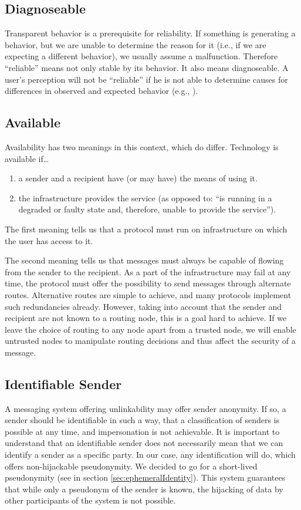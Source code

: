 \subsection{Diagnoseable}
Transparent behavior is a prerequisite for reliability. If something is generating a  behavior, but we are unable to determine the reason for it (i.e., if we are expecting a different behavior), we usually assume a malfunction. Therefore ``reliable'' means not only stable by its behavior. It also means diagnoseable. A user's perception will not be ``reliable'' if he is not able to determine causes for differences in observed and expected behavior (e.g., \cite{nicholson2003assessing}).

\subsection{Available}
Availability has two meanings in this context, which do differ. Technology is available if\ldots
\begin{enumerate}
	\item a sender and a recipient have (or may have) the means of using it.
	\item the infrastructure provides the service (as opposed to: ``is running in a degraded or faulty state and, therefore, unable to provide the service'').
\end{enumerate}

The first meaning tells us that a protocol must run on infrastructure on which the user has access to it.

The second meaning tells us that messages must always be capable of flowing from the sender to the recipient. As a part of the infrastructure may fail at any time, the protocol must offer the possibility to send messages through alternate routes. Alternative routes are simple to achieve, and many protocols implement such redundancies already. However, taking into account that the sender and recipient are not known to a routing node, this is a goal hard to achieve. If we leave the choice of routing to any node apart from a trusted node, we will enable untrusted nodes to manipulate routing decisions and thus affect the security of a message.

\subsection{Identifiable Sender}
A messaging system offering unlinkability may offer sender anonymity. If so, a sender should be identifiable in such a way, that a classification of senders is possible at any time, and impersonation is not achievable. It is important to understand that an identifiable sender does not necessarily mean that we can identify a sender as a specific party. In our case, any identification will do, which offers non-hijackable pseudonymity. We decided to go for a short-lived pseudonymity (see  in section \ref{sec:ephemeralIdentity}). This system guarantees that while only a pseudonym of the sender is known, the hijacking of data by other participants of the system is not possible.

